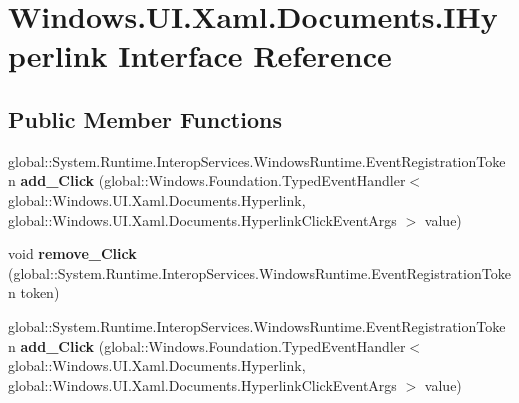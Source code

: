 \hypertarget{interface_windows_1_1_u_i_1_1_xaml_1_1_documents_1_1_i_hyperlink}{}\section{Windows.\+U\+I.\+Xaml.\+Documents.\+I\+Hyperlink Interface Reference}
\label{interface_windows_1_1_u_i_1_1_xaml_1_1_documents_1_1_i_hyperlink}
\subsection*{Public Member Functions}
\begin{DoxyCompactItemize}
\item 
\mbox{\label{interface_windows_1_1_u_i_1_1_xaml_1_1_documents_1_1_i_hyperlink_a8c7876ee55723e6e4fc0c3a7d0426de1}} 
global\+::\+System.\+Runtime.\+Interop\+Services.\+Windows\+Runtime.\+Event\+Registration\+Token {\bfseries add\+\_\+\+Click} (global\+::\+Windows.\+Foundation.\+Typed\+Event\+Handler$<$ global\+::\+Windows.\+U\+I.\+Xaml.\+Documents.\+Hyperlink, global\+::\+Windows.\+U\+I.\+Xaml.\+Documents.\+Hyperlink\+Click\+Event\+Args $>$ value)
\item 
\mbox{\label{interface_windows_1_1_u_i_1_1_xaml_1_1_documents_1_1_i_hyperlink_afd983db4770a373b17838ad79c3ffb1a}} 
void {\bfseries remove\+\_\+\+Click} (global\+::\+System.\+Runtime.\+Interop\+Services.\+Windows\+Runtime.\+Event\+Registration\+Token token)
\item 
\mbox{\label{interface_windows_1_1_u_i_1_1_xaml_1_1_documents_1_1_i_hyperlink_a8c7876ee55723e6e4fc0c3a7d0426de1}} 
global\+::\+System.\+Runtime.\+Interop\+Services.\+Windows\+Runtime.\+Event\+Registration\+Token {\bfseries add\+\_\+\+Click} (global\+::\+Windows.\+Foundation.\+Typed\+Event\+Handler$<$ global\+::\+Windows.\+U\+I.\+Xaml.\+Documents.\+Hyperlink, global\+::\+Windows.\+U\+I.\+Xaml.\+Documents.\+Hyperlink\+Click\+Event\+Args $>$ value)
\item 
\mbox{\label{interface_windows_1_1_u_i_1_1_xaml_1_1_documents_1_1_i_hyperlink_afd983db4770a373b17838ad79c3ffb1a}} 

\end{DoxyCompactItemize}
